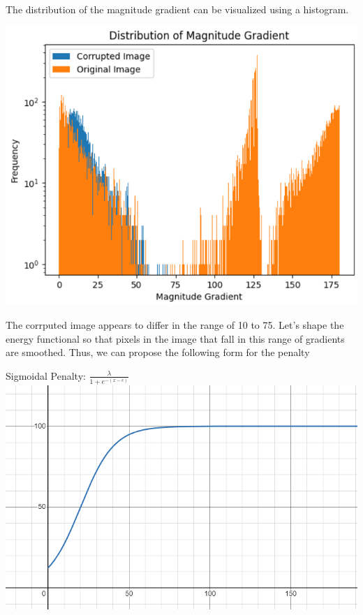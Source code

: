 \documentclass{article}
\begin{document}
  \newpage
  \noindent
  The distribution of the magnitude gradient can be visualized using a histogram.
  \begin{center}
    \includegraphics[scale=0.5]{../report_images/gradient.png}
  \end{center}
  \vspace{12pt}

  \noindent
  The corrputed image appears to differ in the range of 10 to 75.
  Let's shape the energy functional so that pixels in the image that
  fall in this range of gradients are smoothed. Thus, we
  can propose the following form for the penalty
  \begin{center}
    Sigmoidal Penalty: $\frac{\lambda}{1+e^{-(x-c)}}$\\
    \vspace{12pt}
    \includegraphics[scale=0.5]{../report_images/sigmoid.png}
  \end{center}
  \vspace{12pt}
\end{document}
